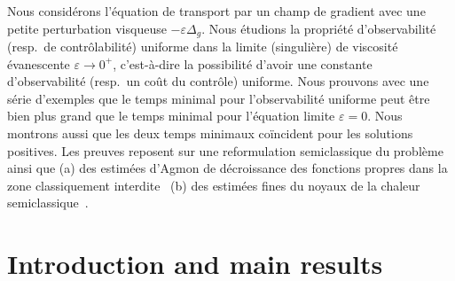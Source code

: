 \documentclass[JEP,XML,SOM,Unicode]{cedram}
\theoremstyle{definition}
\begin{document}

\begin{altabstract}
Nous considérons l'équation de transport par un champ de gradient avec une petite perturbation visqueuse $-\varepsilon \Delta_g$. Nous étudions la propriété d'observabilité (resp.\ de contrôlabilité) uniforme dans la limite (singulière) de viscosité évanescente $\varepsilon\to0^+$, c'est-à-dire la possibilité d'avoir une constante d'observabilité (resp.\ un coût du contrôle) uniforme. Nous prouvons avec une série d'exemples que le temps minimal pour l'observabilité uniforme peut être bien plus grand que le temps minimal pour l'équation limite $\varepsilon=0$. Nous montrons aussi que les deux temps minimaux coïncident pour les solutions positives. Les preuves reposent sur une reformulation semiclassique du problème ainsi que (a) des estimées d'Agmon de décroissance des fonctions propres dans la zone classiquement interdite~ (b) des estimées fines du noyaux de la chaleur semiclassique~.
\end{altabstract}

\maketitle
\vspace*{-\baselineskip}
\tableofcontents
\mainmatter

\section{Introduction and main results}
\end{document}
